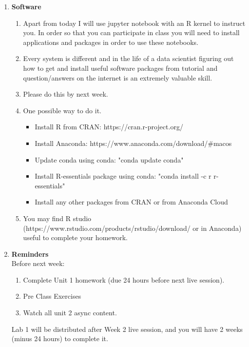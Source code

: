 \documentclass[12pt,a4paper]{article}
\numberwithin{equation}{subsection}
\begin{document}
\begin{enumerate}
\item \textbf{Software}
\begin{enumerate} 
    \item Apart from today I will use jupyter notebook with an R kernel to instruct you. In order so that you can participate in class you will need to install applications and packages in order to use these notebooks. 
    \item Every system is different and in the life of a data scientist figuring out how to get and install useful software packages from tutorial and question/answers on the internet is an extremely valuable skill.  
    \item Please do this by next week. 
    \item One possible way to do it. 
    \begin{itemize} 
        \item Install R from CRAN: https://cran.r-project.org/
        \item Install Anaconda: https://www.anaconda.com/download/\#macos
        \item Update conda using conda: "conda update conda"
        \item Install R-essentials package using conda: "conda install -c r r-essentials"
        \item Install any other packages from CRAN or from Anaconda Cloud
    \end{itemize}
    \item You may find R studio (https://www.rstudio.com/products/rstudio/download/ or in Anaconda) useful to complete your homework.
   
\end{enumerate}



\item \textbf{Reminders}\\
Before next week:
\begin{enumerate}
\item Complete Unit 1 homework (due 24 hours before next live session).
\item Pre Class Exercises
\item Watch all unit 2 async content.
\end{enumerate}
Lab 1 will be distributed after Week 2 live session, and you will have 2 weeks (minus 24 hours) to complete it.

\end{enumerate}
\end{document}
